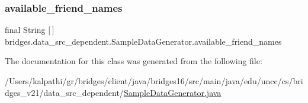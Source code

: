 \subsubsection{\texorpdfstring{available\+\_\+friend\+\_\+names}{available\_friend\_names}}
{\footnotesize\ttfamily final String \mbox{[}$\,$\mbox{]} bridges.\+data\+\_\+src\+\_\+dependent.\+Sample\+Data\+Generator.\+available\+\_\+friend\+\_\+names\hspace{0.3cm}{\ttfamily [static]}}



The documentation for this class was generated from the following file\+:\begin{DoxyCompactItemize}
\item 
/\+Users/kalpathi/gr/bridges/client/java/bridges16/src/main/java/edu/uncc/cs/bridges\+\_\+v21/data\+\_\+src\+\_\+dependent/\hyperlink{_sample_data_generator_8java}{Sample\+Data\+Generator.\+java}\end{DoxyCompactItemize}
